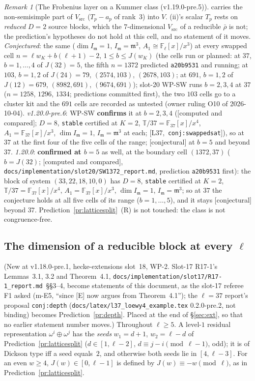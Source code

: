 \documentclass[11pt]{article}
\theoremstyle{remark}
\newtheorem{remark}[theorem]{Remark}
\newcommand{\F}{\mathbb{F}}
\newcommand{\Fl}{\F_\ell}
\newcommand{\T}{\mathbb{T}}
\newcommand{\m}{\mathfrak{m}}
\newcommand{\CONJ}{\textsf{[conjectural]}}
\newcommand{\CMPD}{\textsf{[computed and compared]}}   %
\newcommand{\Lcite}[1]{[L37,~\texttt{#1}]}             %
\begin{document}
\begin{remark}[The Frobenius layer on a Kummer class (v1.19.0-pre.5)]
carries the non-semisimple part of $V_{\mathrm{src}}$ ($T_p-a_p$ of rank~$3$) into $V$. (ii)'s scalar $T_p$ rests on \emph{reduced} $D=2$ source blocks, which the $7$-dimensional
$V_{\mathrm{src}}$ of a reducible $\bar\rho$ is not; the prediction's hypotheses do not hold at this cell, and no statement of it moves. \emph{Conjectured}: the same ($\dim I_\m=1$, $I_\m=\m^{3}$, $A_1\cong\Fl[x]/x^{3}$) at every swapped cell $n=\ell w_K+b(\ell+1)-2$, $1\le b\le J(w_K)$ (the cells run or planned: at $37$, $b=1,\dots,4$ of $J(32)=5$, the fifth $n=1372$ predicted
\texttt{a20b9531} and running; at $103$, $b=1,2$ of $J(24)=79$, $(2574,103)$, $(2678,103)$; at $691$, $b=1,2$ of $J(12)=679$, $(8982,691)$, $(9674,691)$); slot-20 WP-SW runs $b=2,3,4$ at $37$ ($n=1258$, $1296$, $1334$; predictions committed first), the two $103$ cells go to a cluster kit
and the $691$ cells are recorded as untested (owner ruling O10 of 2026-10-04). \emph{v1.20.0-pre.6}: WP-SW \textbf{confirms} it at $b=2,3,4$ (\CMPD; $D=8$, \texttt{stable} certified at $K=2$,
$\T/37=\F_{37}[x]/x^{4}$, $A_1=\F_{37}[x]/x^{3}$, $\dim I_\m=1$, $I_\m=\m^{3}$ at each; \Lcite{conj:swappedsat}), so at $37$ at the first four of the five cells of the range; \CONJ{} at $b=5$ and beyond $37$. \emph{1.20.0}: \textbf{confirmed at $b=5$} as well, at the boundary cell
$(1372,37)$ ($b=J(32)$; \CMPD, \texttt{docs/implementation/slot20/SW1372\_report.md}, prediction \texttt{a20b9531} first): the block of system $(33,22,18,10,0)$ has $D=8$, \texttt{stable} certified
at $K=2$, $\T/37=\F_{37}[x]/x^{4}$, $A_1=\F_{37}[x]/x^{3}$, $\dim I_\m=1$, $I_\m=\m^{3}$; so at $37$ the conjecture holds at all five cells of its range ($b=1,\dots,5$), and it stays \CONJ{} beyond $37$. Prediction~\ref{pr:latticesplit}~(R) is not touched: the class is not congruence-free.
\end{remark}

\subsection{The dimension of a reducible block at every \texorpdfstring{$\ell$}{l}}\label{sec:dimblock}
(New at v1.18.0-pre.1, hecke-extensions slot~18, WP-2. Slot-17 R17-1's Lemmas~3.1, 3.2 and Theorem~4.1,
\texttt{docs/implementation/slot17/R17-1\_report.md}~\S\S3--4, become statements of this document, as the slot-17 referee F1 asked (m-E5, ``since [E] now
argues from Theorem~4.1''); the $\ell=37$ report's proposal \texttt{conj:depth} (\texttt{docs/latex/l37\_loewy4\_example.tex} 0.2.0-pre.2, not binding) becomes
Prediction~\ref{pr:depth}. Placed at the end of \S\ref{sec:ext}, so that no earlier statement number moves.) Throughout $\ell\ge5$. A level-$1$ residual
representation $\omega^{i}\oplus\omega^{j}$ has the \emph{seeds} $w_1=d+1$, $w_2=\ell-d$ of Prediction~\ref{pr:latticesplit} ($d\in[1,\ell-2]$, $d\equiv j-i\pmod{\ell-1}$,
odd); it is of Dickson type iff a seed equals~$2$, and otherwise both seeds lie in $[4,\ell-3]$. For an even $w\ge4$, $J(w)\in[0,\ell-1]$ is defined by
$J(w)\equiv-w\pmod\ell$, as in Prediction~\ref{pr:latticesplit}.
\end{document}
